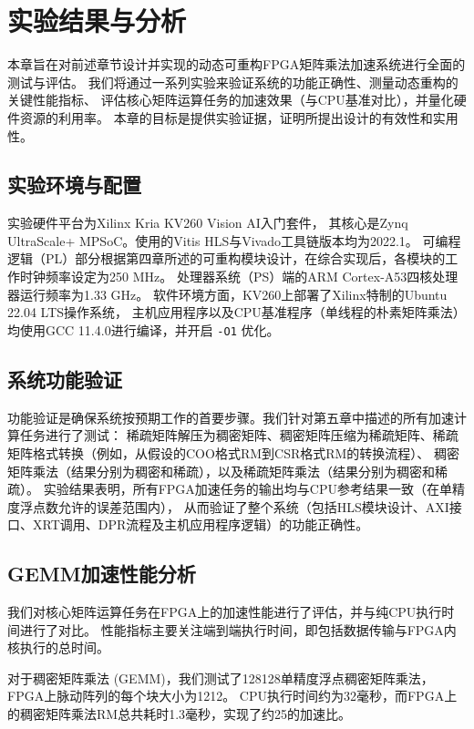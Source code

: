 \chapter{实验结果与分析}

本章旨在对前述章节设计并实现的动态可重构FPGA矩阵乘法加速系统进行全面的测试与评估。
我们将通过一系列实验来验证系统的功能正确性、测量动态重构的关键性能指标、
评估核心矩阵运算任务的加速效果（与CPU基准对比），并量化硬件资源的利用率。
本章的目标是提供实验证据，证明所提出设计的有效性和实用性。

\section{实验环境与配置}

实验硬件平台为Xilinx Kria KV260 Vision AI入门套件，
其核心是Zynq UltraScale+ MPSoC。使用的Vitis HLS与Vivado工具链版本均为2022.1。
可编程逻辑（PL）部分根据第四章所述的可重构模块设计，在综合实现后，各模块的工作时钟频率设定为250 MHz。
处理器系统（PS）端的ARM Cortex-A53四核处理器运行频率为1.33 GHz。
软件环境方面，KV260上部署了Xilinx特制的Ubuntu 22.04 LTS操作系统，
主机应用程序以及CPU基准程序（单线程的朴素矩阵乘法）均使用GCC 11.4.0进行编译，并开启 \verb|-O1| 优化。

\section{系统功能验证}

功能验证是确保系统按预期工作的首要步骤。我们针对第五章中描述的所有加速计算任务进行了测试：
稀疏矩阵解压为稠密矩阵、稠密矩阵压缩为稀疏矩阵、稀疏矩阵格式转换（例如，从假设的COO格式RM到CSR格式RM的转换流程）、
稠密矩阵乘法（结果分别为稠密和稀疏），以及稀疏矩阵乘法（结果分别为稠密和稀疏）。
实验结果表明，所有FPGA加速任务的输出均与CPU参考结果一致（在单精度浮点数允许的误差范围内），
从而验证了整个系统（包括HLS模块设计、AXI接口、XRT调用、DPR流程及主机应用程序逻辑）的功能正确性。

\section{GEMM加速性能分析}

我们对核心矩阵运算任务在FPGA上的加速性能进行了评估，并与纯CPU执行时间进行了对比。
性能指标主要关注端到端执行时间，即包括数据传输与FPGA内核执行的总时间。

对于稠密矩阵乘法 (GEMM)，我们测试了128\texttimes{}128单精度浮点稠密矩阵乘法，FPGA上脉动阵列的每个块大小为12\texttimes{}12。
CPU执行时间约为32毫秒，而FPGA上的稠密矩阵乘法RM总共耗时1.3毫秒，实现了约25\texttimes{}的加速比。


